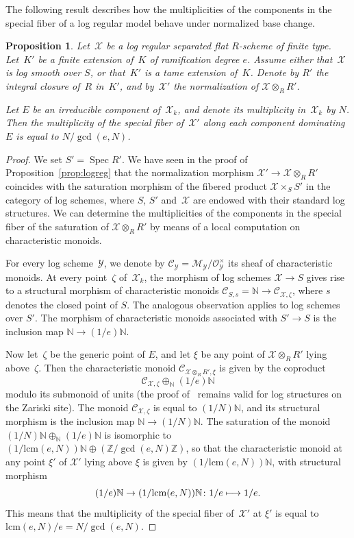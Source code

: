 \documentclass[11pt]{article}
\let\mathcal\mathscr
\newcommand{\mto}{\mathchoice{\longmapsto}{\mapsto}{\mapsto}{\mapsto}}
\newtheorem{prop}[equation]{Proposition}
\theoremstyle{definition}
\numberwithin{equation}{subsection}
\newcommand{\N}{\ensuremath{\mathbb{N}}}
\newcommand{\Z}{\ensuremath{\mathbb{Z}}}
\newcommand{\cX}{\ensuremath{\mathscr{X}}}
\newcommand{\cY}{\ensuremath{\mathscr{Y}}}
\newcommand{\lcm}{\mathrm{lcm}}
\DeclareMathOperator{\Spec}{Spec}
\begin{document}
The following result describes how the multiplicities of the components in the special fiber of a log regular model behave under normalized base change.
\begin{prop}\label{prop:saturated}
Let~$\cX$ be a log regular separated flat $R$\nobreakdash-scheme of finite type.
Let~$K'$ be a finite extension of~$K$ of ramification degree $e$. Assume either that~$\cX$ is log smooth over $S$, or that~$K'$ is a tame extension of~$K$.
Denote by $R'$ the integral closure of~$R$ in~$K'$, and by~$\cX'$ the normalization of $\cX\otimes_R R'$.

Let $E$ be an irreducible component of~$\cX_k$, and denote its multiplicity in~$\cX_k$ by $N$.
Then the multiplicity of the special fiber of~$\cX'$ along each component dominating $E$ is equal to $N/\gcd(e,N)$.
\end{prop}
\begin{proof}
We set $S'=\Spec R'$.
We have seen in the proof of Proposition~\ref{prop:logreg} that the normalization morphism $\cX'\to \cX\otimes_R R'$ coincides with the saturation morphism of
the fibered product $\cX\times_S S'$ in the category of log schemes, where $S$, $S'$ and~$\cX$ are endowed with their standard log structures. We can determine the multiplicities of the components in the special fiber of the saturation of $\cX\otimes_R R'$ by means of a local computation on characteristic monoids.

For every log scheme~$\cY$, we denote by $\mathcal{C}_{\cY}=\mathcal{M}_{\cY}/\mathcal{O}^{\times}_{\cY}$ its sheaf of characteristic monoids. At every point~$\zeta$ of~$\cX_k$, the morphism of log schemes
$\cX\to S$ gives rise to a structural morphism of characteristic monoids $\mathcal{C}_{S,s}=\N\to \mathcal{C}_{\cX,\zeta}$, where $s$ denotes the closed point of $S$. The analogous observation applies to log schemes over $S'$. The morphism of characteristic monoids associated with $S'\to S$ is the inclusion map $\N\to (1/e)\N$.

Now let~$\zeta$ be the generic point of $E$, and let $\xi$ be any point of $\cX\otimes_R R'$ lying above~$\zeta$.
Then the characteristic monoid
$\mathcal{C}_{\cX\otimes_R R',\xi}$ is given by the coproduct
\[
\mathcal{C}_{\cX,\zeta}\oplus_{\N}(1/e)\N
\]
modulo its submonoid of units (the proof of~\cite[2.1.1]{nakayama} remains valid for log structures on the Zariski site).
The monoid $\mathcal{C}_{\cX,\zeta}$ is equal to $(1/N)\N$, and its structural morphism is the inclusion map $\N\to (1/N)\N$. The saturation of the monoid $(1/N)\N\oplus_{\N}(1/e)\N$ is isomorphic to $(1/\lcm(e,N))\N\oplus (\Z/\gcd(e,N)\Z)$, so that the characteristic monoid at any point $\xi'$ of
$\cX'$ lying above $\xi$ is given by $(1/\lcm(e,N))\N$, with structural morphism
\[
(1/e)\N\to (1/\lcm(e,N))\N\colon 1/e\mto 1/e.
\]
This means that the multiplicity of the special fiber of~$\cX'$ at $\xi'$ is equal to $\lcm(e,N)/e=N/\gcd(e,N)$.
\end{proof}
\end{document}

